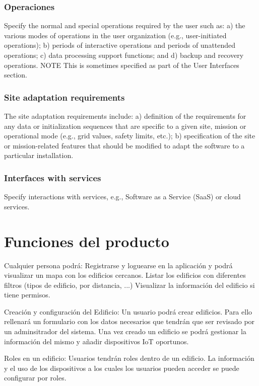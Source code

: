 \documentclass[12pt, a4paper, twoside]{article}
\begin{document}
\subsubsection{Operaciones}
Specify the normal and special operations required by the user such as:
a) the various modes of operations in the user organization (e.g., user-initiated operations);
b) periods of interactive operations and periods of unattended operations;
c) data processing support functions; and
d) backup and recovery operations.
NOTE This is sometimes specified as part of the User Interfaces section.

\subsubsection{Site adaptation requirements}
The site adaptation requirements include:
a) definition of the requirements for any data or initialization sequences that are specific to a given
site, mission or operational mode (e.g., grid values, safety limits, etc.);
b) specification of the site or mission-related features that should be modified to adapt the software
to a particular installation.

\subsubsection{Interfaces with services}
Specify interactions with services, e.g., Software as a Service (SaaS) or cloud services.


\section{Funciones del producto}
Cualquier persona podrá:
 Registrarse y loguearse en la aplicación y podrá visualizar un mapa con los edificios cercanos.
 Listar los edificios con diferentes filtros (tipos de edificio, por distancia, ...)
 Visualizar la información del edificio si tiene permisos.

Creación y configuración del Edificio:
 Un usuario podrá crear edificios. Para ello rellenará un formulario con los datos necesarios que
 tendrán que ser revisado por un adminsitrador del sistema.
 Una vez creado un edificio se podrá gestionar la información del mismo y añadir dispositivos IoT oportunos.

Roles en un edificio:
 Usuarios tendrán roles dentro de un edificio. La información y el uso de los dispositivos a los cuales
 los usuarios pueden acceder se puede configurar por roles.
\end{document}
